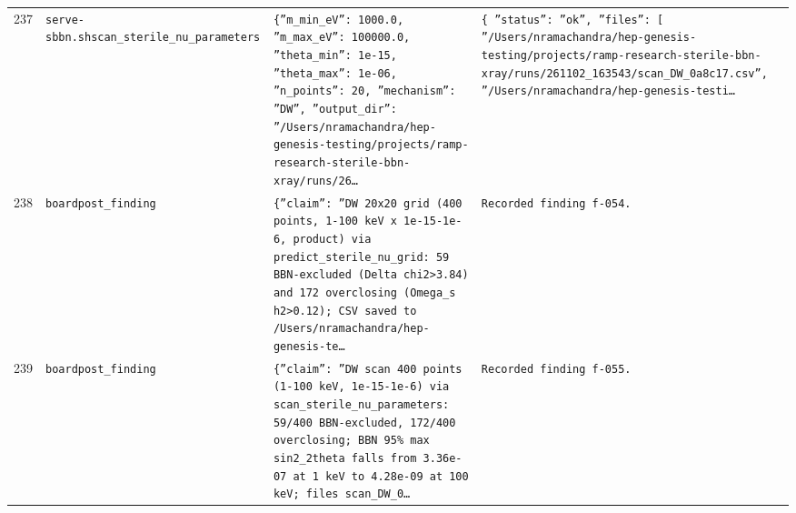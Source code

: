 \documentclass[11pt,a4paper]{article}
\begin{document}
\begin{longtable}{@{}p{}p{}p{}p{}@{}}
237 & \texttt{serve-sbbn.sh}\newline\texttt{scan\_\allowbreak{}sterile\_\allowbreak{}nu\_\allowbreak{}parameters} & \texttt{\{''m\_\allowbreak{}min\_\allowbreak{}eV'':\allowbreak{} 1000.0,\allowbreak{} ''m\_\allowbreak{}max\_\allowbreak{}eV'':\allowbreak{} 100000.0,\allowbreak{} ''theta\_\allowbreak{}min'':\allowbreak{} 1e-15,\allowbreak{} ''theta\_\allowbreak{}max'':\allowbreak{} 1e-06,\allowbreak{} ''n\_\allowbreak{}points'':\allowbreak{} 20,\allowbreak{} ''mechanism'':\allowbreak{} ''DW'',\allowbreak{} ''output\_\allowbreak{}dir'':\allowbreak{} ''/\allowbreak{}Users/\allowbreak{}nramachandra/\allowbreak{}hep-genesis-testing/\allowbreak{}projects/\allowbreak{}ramp-research-sterile-bbn-xray/\allowbreak{}runs/\allowbreak{}26\ldots{}\allowbreak{}} & \texttt{\{   ''status'':\allowbreak{} ''ok'',\allowbreak{}   ''files'':\allowbreak{} [     ''/\allowbreak{}Users/\allowbreak{}nramachandra/\allowbreak{}hep-genesis-testing/\allowbreak{}projects/\allowbreak{}ramp-research-sterile-bbn-xray/\allowbreak{}runs/\allowbreak{}261102\_\allowbreak{}163543/\allowbreak{}scan\_\allowbreak{}DW\_\allowbreak{}0a8c17.csv'',\allowbreak{}     ''/\allowbreak{}Users/\allowbreak{}nramachandra/\allowbreak{}hep-genesis-testi\ldots{}\allowbreak{}} \\
238 & \texttt{board}\newline\texttt{post\_\allowbreak{}finding} & \texttt{\{''claim'':\allowbreak{} ''DW 20x20 grid (400 points,\allowbreak{} 1-100 keV x 1e-15-1e-6,\allowbreak{} product)\allowbreak{} via predict\_\allowbreak{}sterile\_\allowbreak{}nu\_\allowbreak{}grid:\allowbreak{} 59 BBN-excluded (Delta chi2\textgreater{}\allowbreak{}3.84)\allowbreak{} and 172 overclosing (Omega\_\allowbreak{}s h2\textgreater{}\allowbreak{}0.12)\allowbreak{};\allowbreak{} CSV saved to /\allowbreak{}Users/\allowbreak{}nramachandra/\allowbreak{}hep-genesis-te\ldots{}\allowbreak{}} & \texttt{Recorded finding f-054.} \\
239 & \texttt{board}\newline\texttt{post\_\allowbreak{}finding} & \texttt{\{''claim'':\allowbreak{} ''DW scan 400 points (1-100 keV,\allowbreak{} 1e-15-1e-6)\allowbreak{} via scan\_\allowbreak{}sterile\_\allowbreak{}nu\_\allowbreak{}parameters:\allowbreak{} 59/\allowbreak{}400 BBN-excluded,\allowbreak{} 172/\allowbreak{}400 overclosing;\allowbreak{} BBN 95\% max sin2\_\allowbreak{}2theta falls from 3.36e-07 at 1 keV to 4.28e-09 at 100 keV;\allowbreak{} files scan\_\allowbreak{}DW\_\allowbreak{}0\ldots{}\allowbreak{}} & \texttt{Recorded finding f-055.} \\

\end{longtable}
\end{document}
